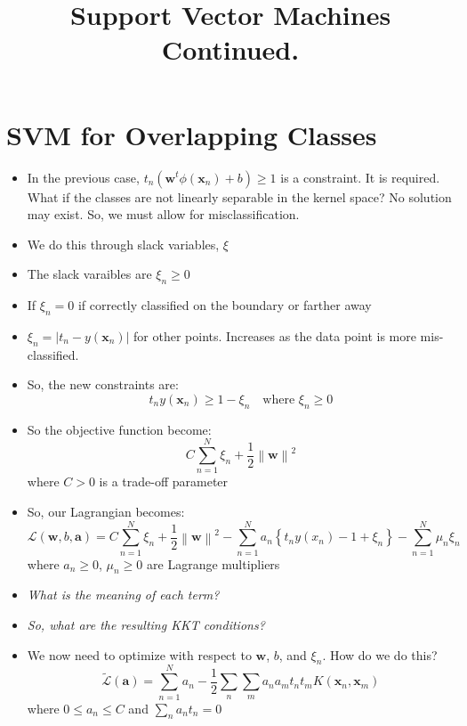 \documentclass[11pt]{amsart}
\title{Support Vector Machines Continued.  }
\def\x{\mathbf{x}}
\def\w{\mathbf{w}}
\begin{document}
\maketitle

\section{SVM for Overlapping Classes}
\begin{itemize}
\item In the previous case, $t_n\left(\w^t\phi(\x_n) + b\right)\ge 1$ is a constraint. It is required.  What if the classes are not linearly separable in the kernel space? No solution may exist.  So, we must allow for misclassification. 
\item We do this through slack variables, $\xi$
\item The slack varaibles are $\xi_n\ge 0$
\item If $\xi_n = 0$ if correctly classified on the boundary or farther away
\item $\xi_n = |t_n - y(\x_n)|$ for other points.  Increases as the data point is more mis-classified. 
\item So, the new constraints are:
\begin{equation}
t_n y(\x_n) \ge 1 - \xi_n \quad \text{where } \xi_n \ge 0
\end{equation}
\item So the objective function become:
\begin{equation}
C\sum_{n=1}^N\xi_n + \frac{1}{2}\left\| \w \right\|^2
\end{equation}
where $C > 0$ is a trade-off parameter
\item So, our Lagrangian becomes:
\begin{equation}
\mathscr{L}(\w, b, \mathbf{a}) = C\sum_{n=1}^N\xi_n + \frac{1}{2}\left\| \w \right\|^2 - \sum_{n=1}^N a_n\left\{ t_ny(x_n) - 1 +\xi_n\right\} - \sum_{n=1}^N \mu_n\xi_n
\end{equation}
where $a_n \ge 0$, $\mu_n \ge 0$ are Lagrange multipliers
\item\emph{What is the meaning of each term?}
\item \emph{So, what are the resulting KKT conditions? }
\item We now need to optimize with respect to $\w$, $b$, and $\xi_n$.  How do we do this?                           
\begin{equation}
\tilde{\mathscr{L}}(\mathbf{a}) = \sum_{n=1}^N a_n - \frac{1}{2} \sum_n \sum_m a_n a_m t_n t_m K(\x_n, \x_m)
\end{equation}
where $0 \le a_n \le C$ and $\sum_n a_nt_n = 0$


\end{itemize}
\end{document}
